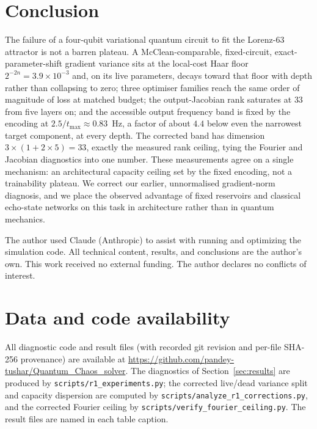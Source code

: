 \documentclass[a4paper,12pt]{iopart}
\begin{document}
\section{Conclusion}

The failure of a four-qubit variational quantum circuit to fit the Lorenz-63
attractor is not a barren plateau. A McClean-comparable, fixed-circuit,
exact-parameter-shift gradient variance sits at the local-cost Haar floor
$2^{-2n}=3.9\times10^{-3}$ and, on its live parameters, decays toward that floor
with depth rather than collapsing to zero; three optimiser families reach the
same order of magnitude of loss at matched budget; the output-Jacobian rank
saturates at $33$ from five layers on; and the accessible output frequency band
is fixed by the encoding at $2.5/t_{\max}\approx0.83$~Hz, a factor of about
$4.4$ below even the narrowest target component, at every depth. The corrected
band has dimension $3\times(1+2\times5)=33$, exactly the measured rank ceiling,
tying the Fourier and Jacobian diagnostics into one number. These measurements
agree on a single mechanism: an architectural capacity ceiling set by the fixed
encoding, not a trainability plateau. We correct our earlier, unnormalised
gradient-norm diagnosis, and we place the observed advantage of fixed reservoirs
and classical echo-state networks on this task in architecture rather than in
quantum mechanics.

\ack
The author used Claude (Anthropic) to assist with running and optimizing the
simulation code. All technical content, results, and conclusions are the
author's own. This work received no external funding. The author declares no
conflicts of interest.

\section*{Data and code availability}
\label{sec:availability}

All diagnostic code and result files (with recorded git revision and per-file
SHA-256 provenance) are available at
\url{https://github.com/pandey-tushar/Quantum_Chaos_solver}. The diagnostics of
Section~\ref{sec:results} are produced by \texttt{scripts/r1\_experiments.py};
the corrected live/dead variance split and capacity dispersion are computed by
\texttt{scripts/analyze\_r1\_corrections.py}, and the corrected Fourier ceiling
by \texttt{scripts/verify\_fourier\_ceiling.py}. The result files are named in
each table caption.
\end{document}
